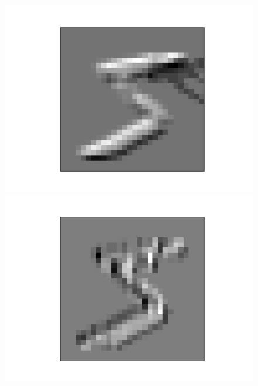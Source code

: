 \documentclass[11pt]{article}
\begin{document}
\begin{figure}[h]
\begin{minipage}{0.2\linewidth}
		\includegraphics[width=\linewidth]{../graphics/mnist_5/conv_only/mnist_5_lower_edges.png}
	\end{minipage}
	\hfill
	\begin{minipage}{0.2\linewidth}
		\centering
		\includegraphics[width=\linewidth]{../graphics/mnist_5/conv_only/mnist_5_right_edges.png}
	\end{minipage}
\\
	\begin{minipage}{0.2\linewidth}
	\centering

\end{minipage}
\end{figure}
\end{document}
